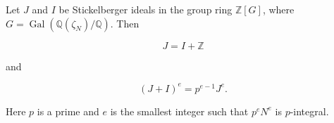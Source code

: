 Let $J$ and $I$ be Stickelberger ideals in the group ring $\mathbb{Z}[G]$, where $G = \operatorname{Gal}(\mathbb{Q}(\zeta_N)/\mathbb{Q})$. Then

$$
J = I + \mathbb{Z}
$$

and

$$
(J + I)^e = p^{e-1} J^e.
$$

Here $p$ is a prime and $e$ is the smallest integer such that $p^e N^e$ is $p$-integral.
